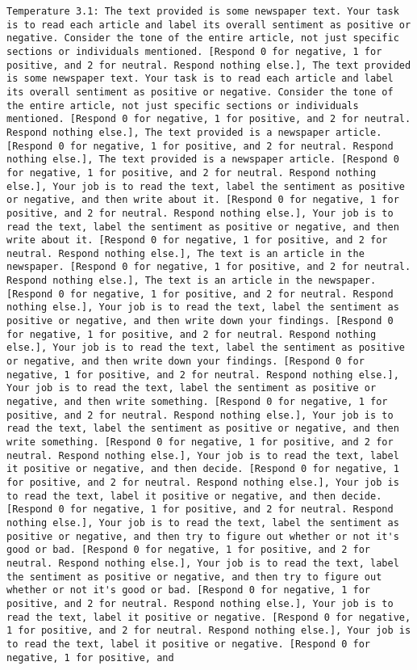 \begin{lstlisting}[label=lst:poor_performing_prompts]
	Temperature 3.1: The text provided is some newspaper text. Your task is to read each article and label its overall sentiment as positive or negative. Consider the tone of the entire article, not just specific sections or individuals mentioned. [Respond 0 for negative, 1 for positive, and 2 for neutral. Respond nothing else.], The text provided is some newspaper text. Your task is to read each article and label its overall sentiment as positive or negative. Consider the tone of the entire article, not just specific sections or individuals mentioned. [Respond 0 for negative, 1 for positive, and 2 for neutral. Respond nothing else.], The text provided is a newspaper article. [Respond 0 for negative, 1 for positive, and 2 for neutral. Respond nothing else.], The text provided is a newspaper article. [Respond 0 for negative, 1 for positive, and 2 for neutral. Respond nothing else.], Your job is to read the text, label the sentiment as positive or negative, and then write about it. [Respond 0 for negative, 1 for positive, and 2 for neutral. Respond nothing else.], Your job is to read the text, label the sentiment as positive or negative, and then write about it. [Respond 0 for negative, 1 for positive, and 2 for neutral. Respond nothing else.], The text is an article in the newspaper. [Respond 0 for negative, 1 for positive, and 2 for neutral. Respond nothing else.], The text is an article in the newspaper. [Respond 0 for negative, 1 for positive, and 2 for neutral. Respond nothing else.], Your job is to read the text, label the sentiment as positive or negative, and then write down your findings. [Respond 0 for negative, 1 for positive, and 2 for neutral. Respond nothing else.], Your job is to read the text, label the sentiment as positive or negative, and then write down your findings. [Respond 0 for negative, 1 for positive, and 2 for neutral. Respond nothing else.], Your job is to read the text, label the sentiment as positive or negative, and then write something. [Respond 0 for negative, 1 for positive, and 2 for neutral. Respond nothing else.], Your job is to read the text, label the sentiment as positive or negative, and then write something. [Respond 0 for negative, 1 for positive, and 2 for neutral. Respond nothing else.], Your job is to read the text, label it positive or negative, and then decide. [Respond 0 for negative, 1 for positive, and 2 for neutral. Respond nothing else.], Your job is to read the text, label it positive or negative, and then decide. [Respond 0 for negative, 1 for positive, and 2 for neutral. Respond nothing else.], Your job is to read the text, label the sentiment as positive or negative, and then try to figure out whether or not it's good or bad. [Respond 0 for negative, 1 for positive, and 2 for neutral. Respond nothing else.], Your job is to read the text, label the sentiment as positive or negative, and then try to figure out whether or not it's good or bad. [Respond 0 for negative, 1 for positive, and 2 for neutral. Respond nothing else.], Your job is to read the text, label it positive or negative. [Respond 0 for negative, 1 for positive, and 2 for neutral. Respond nothing else.], Your job is to read the text, label it positive or negative. [Respond 0 for negative, 1 for positive, and 
\end{lstlisting}
